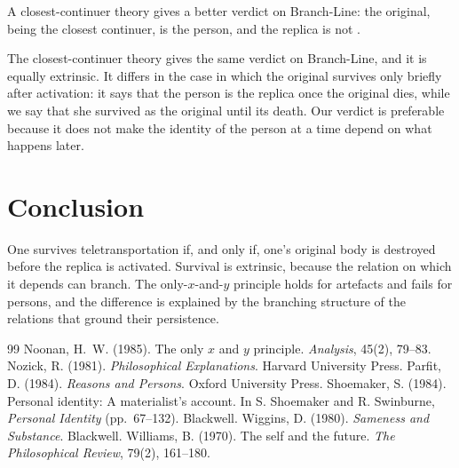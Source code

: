 \documentclass{situationist-preprint}
\begin{document}
\begin{objection}
A closest-continuer theory gives a better verdict on Branch-Line: the original, being the closest continuer, is the person, and the replica is not \citep{Nozick1981}.
\end{objection}

\begin{reply}
The closest-continuer theory gives the same verdict on Branch-Line, and it is equally extrinsic. It differs in the case in which the original survives only briefly after activation: it says that the person is the replica once the original dies, while we say that she survived as the original until its death. Our verdict is preferable because it does not make the identity of the person at a time depend on what happens later.
\end{reply}

\section{Conclusion}

One survives teletransportation if, and only if, one's original body is destroyed before the replica is activated. Survival is extrinsic, because the relation on which it depends can branch. The only-$x$-and-$y$ principle holds for artefacts and fails for persons, and the difference is explained by the branching structure of the relations that ground their persistence.

\begin{thebibliography}{99}\small
{} Noonan, H.~W. (1985). The only $x$ and $y$ principle. \emph{Analysis}, 45(2), 79--83.
 Nozick, R. (1981). \emph{Philosophical Explanations}. Harvard University Press.
 Parfit, D. (1984). \emph{Reasons and Persons}. Oxford University Press.
 Shoemaker, S. (1984). Personal identity: A materialist's account. In S. Shoemaker and R. Swinburne, \emph{Personal Identity} (pp.~67--132). Blackwell.
 Wiggins, D. (1980). \emph{Sameness and Substance}. Blackwell.
 Williams, B. (1970). The self and the future. \emph{The Philosophical Review}, 79(2), 161--180.
\end{thebibliography}
\end{document}
